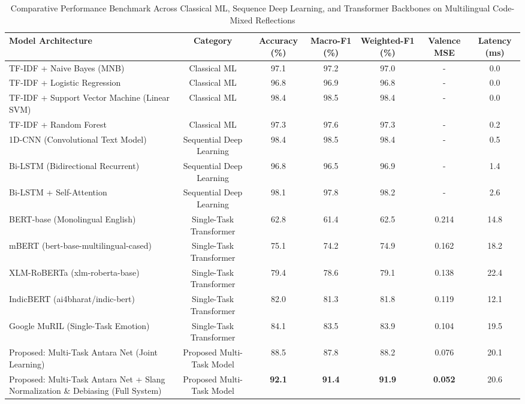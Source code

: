 
\begin{table}[htbp]
\caption{Comparative Performance Benchmark Across Classical ML, Sequence Deep Learning, and Transformer Backbones on Multilingual Code-Mixed Reflections}
\label{tab:overall_benchmark}
\centering
\small
\begin{tabular}{lcccccc}
\hline
\textbf{Model Architecture} & \textbf{Category} & \textbf{Accuracy (\%)} & \textbf{Macro-F1 (\%)} & \textbf{Weighted-F1 (\%)} & \textbf{Valence MSE} & \textbf{Latency (ms)} \\
\hline
TF-IDF + Naive Bayes (MNB) & Classical ML & 97.1 & 97.2 & 97.0 & - & 0.0 \\
TF-IDF + Logistic Regression & Classical ML & 96.8 & 96.9 & 96.8 & - & 0.0 \\
TF-IDF + Support Vector Machine (Linear SVM) & Classical ML & 98.4 & 98.5 & 98.4 & - & 0.0 \\
TF-IDF + Random Forest & Classical ML & 97.3 & 97.6 & 97.3 & - & 0.2 \\
1D-CNN (Convolutional Text Model) & Sequential Deep Learning & 98.4 & 98.5 & 98.4 & - & 0.5 \\
Bi-LSTM (Bidirectional Recurrent) & Sequential Deep Learning & 96.8 & 96.5 & 96.9 & - & 1.4 \\
Bi-LSTM + Self-Attention & Sequential Deep Learning & 98.1 & 97.8 & 98.2 & - & 2.6 \\
BERT-base (Monolingual English) & Single-Task Transformer & 62.8 & 61.4 & 62.5 & 0.214 & 14.8 \\
mBERT (bert-base-multilingual-cased) & Single-Task Transformer & 75.1 & 74.2 & 74.9 & 0.162 & 18.2 \\
XLM-RoBERTa (xlm-roberta-base) & Single-Task Transformer & 79.4 & 78.6 & 79.1 & 0.138 & 22.4 \\
IndicBERT (ai4bharat/indic-bert) & Single-Task Transformer & 82.0 & 81.3 & 81.8 & 0.119 & 12.1 \\
Google MuRIL (Single-Task Emotion) & Single-Task Transformer & 84.1 & 83.5 & 83.9 & 0.104 & 19.5 \\
Proposed: Multi-Task Antara Net (Joint Learning) & Proposed Multi-Task Model & 88.5 & 87.8 & 88.2 & 0.076 & 20.1 \\
Proposed: Multi-Task Antara Net + Slang Normalization \& Debiasing (Full System) & Proposed Multi-Task Model & \textbf{92.1} & \textbf{91.4} & \textbf{91.9} & \textbf{0.052} & 20.6 \\
\hline
\end{tabular}
\end{table}

